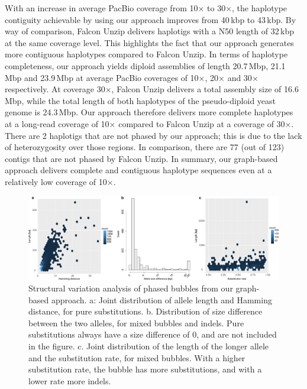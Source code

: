 With an increase in average PacBio coverage from 10$\times$ to 30$\times$, the haplotype contiguity achievable by using our approach improves from 40\,kbp to 43\,kbp.
By way of comparison, Falcon Unzip delivers haplotigs with a N50 length of 32\,kbp at the same coverage level. This highlights the fact that our approach generates more contiguous haplotypes compared to Falcon Unzip.
In terms of haplotype completeness, our approach yields diploid assemblies of length 20.7\,Mbp, 21.1\,Mbp and 23.9\,Mbp at average PacBio coverages of 10$\times$, 20$\times$ and 30$\times$ respectively.
At coverage 30$\times$, Falcon Unzip delivers a total assembly size of 16.6\,Mbp, while the total length of both haplotypes of the pseudo-diploid yeast genome is 24.3\,Mbp.
Our approach therefore delivers more complete haplotypes at a long-read coverage of 10$\times$ compared to Falcon Unzip at a coverage of 30$\times$.
There are 2 haplotigs that are not phased by our approach; this is due to the lack of heterozygosity over those regions.
In comparison, there are 77 (out of 123) contigs that are not phased by Falcon Unzip.
In summary, our graph-based approach delivers complete and contiguous haplotype sequences even at a relatively low coverage of 10$\times$.
\begin{figure}[t!]
\begin{center}
\includegraphics[width=\textwidth]{bubble-breakdown}%
\end{center}
\caption{Structural variation analysis of phased bubbles from our graph-based approach.
a: Joint distribution of allele length and Hamming distance, for pure substitutions.
b. Distribution of size difference between the two alleles, for mixed bubbles and indels. 
Pure substitutions always have a size difference of 0, and are not included in the figure.
c. Joint distribution of the length of the longer allele and the substitution rate, for mixed bubbles.
With a higher substitution rate, the bubble has more substitutions, and with a lower rate more indels.
}
\label{fig:bubble_breakdown}
\end{figure}

